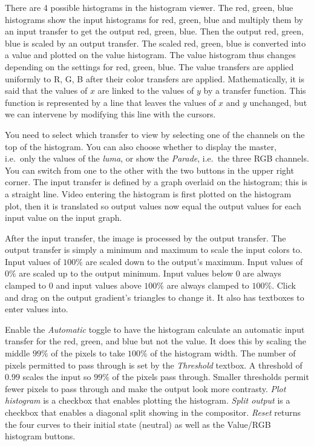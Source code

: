There are 4 possible histograms in the histogram viewer. The red, green, blue histograms show the input histograms for red, green, blue and multiply them by an input transfer to get the output red, green, blue. Then the output red, green, blue is scaled by an output transfer. The scaled red, green, blue is converted into a value and plotted on the value histogram. The value histogram thus changes depending on the settings for red, green, blue. The value transfers are applied uniformly to R, G, B after their color transfers are applied. Mathematically, it is said that the values of $x$ are linked to the values of $y$ by a transfer function. This function is represented by a line that leaves the values of $x$ and $y$ unchanged, but we can intervene by modifying this line with the cursors.

You need to select which transfer to view by selecting one of the channels on the top of the histogram. You can also choose whether to display the master, i.e.\ only the values of the \textit{luma}, or show the \textit{Parade}, i.e.\ the three RGB channels. You can switch from one to the other with the two buttons in the upper right corner. The input transfer is defined by a graph overlaid on the histogram; this is a straight line. Video entering the histogram is first plotted on the histogram plot, then it is translated so output values now equal the output values for each input value on the input graph.

After the input transfer, the image is processed by the output transfer. The output transfer is simply a minimum and maximum to scale the input colors to. Input values of $100\%$ are scaled down to the output's maximum. Input values of $0\%$ are scaled up to the output minimum. Input values below $0$ are always clamped to $0$ and input values above $100\%$ are always clamped to $100\%$. Click and drag on the output gradient's triangles to change it. It also has textboxes to enter values into.

Enable the \textit{Automatic} toggle to have the histogram calculate an automatic input transfer for the red, green, and blue but not the value. It does this by scaling the middle $99\%$ of the pixels to take $100\%$ of the histogram width. The number of pixels permitted to pass through is set by the \textit{Threshold} textbox. A threshold of $0.99$ scales the input so $99\%$ of the pixels pass through. Smaller thresholds permit fewer pixels to pass through and make the output look more contrasty.
\textit{Plot histogram} is a checkbox that enables plotting the histogram.
\textit{Split output} is a checkbox that enables a diagonal split showing in the compositor.
\textit{Reset} returns the four curves to their initial state (neutral) as well as the Value/RGB histogram buttons.

